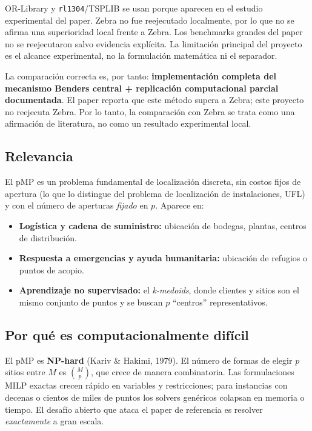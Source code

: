 OR-Library y \texttt{rl1304}/TSPLIB se usan porque aparecen en el estudio experimental del paper.
Zebra no fue reejecutado localmente, por lo que no se afirma una superioridad local frente a
Zebra. Los benchmarks grandes del paper no se reejecutaron salvo evidencia explícita. La limitación
principal del proyecto es el alcance experimental, no la formulación matemática ni el separador.

La comparación correcta es, por tanto: \textbf{implementación completa del mecanismo Benders
central + replicación computacional parcial documentada}. El paper reporta que este método supera a Zebra; este
proyecto no reejecuta Zebra. Por lo tanto, la comparación con Zebra se trata como una afirmación
de literatura, no como un resultado experimental local.

\subsection{Relevancia}
El pMP es un problema fundamental de localización discreta, sin costos fijos de apertura (lo que
lo distingue del problema de localización de instalaciones, UFL) y con el número de aperturas
\emph{fijado} en $p$. Aparece en:
\begin{itemize}[noitemsep]
  \item \textbf{Logística y cadena de suministro:} ubicación de bodegas, plantas, centros de distribución.
  \item \textbf{Respuesta a emergencias y ayuda humanitaria:} ubicación de refugios o puntos de acopio.
  \item \textbf{Aprendizaje no supervisado:} el \textit{k-medoids}, donde clientes y sitios son el
        mismo conjunto de puntos y se buscan $p$ ``centros'' representativos.
\end{itemize}

\subsection{Por qué es computacionalmente difícil}
El pMP es \textbf{NP-hard} (Kariv \& Hakimi, 1979). El número de formas de elegir $p$ sitios entre
$M$ es $\binom{M}{p}$, que crece de manera combinatoria. Las formulaciones MILP exactas crecen
rápido en variables y restricciones; para instancias con decenas o cientos de miles de puntos los
solvers genéricos colapsan en memoria o tiempo. El desafío abierto que ataca el paper de
referencia es resolver \emph{exactamente} a gran escala.

